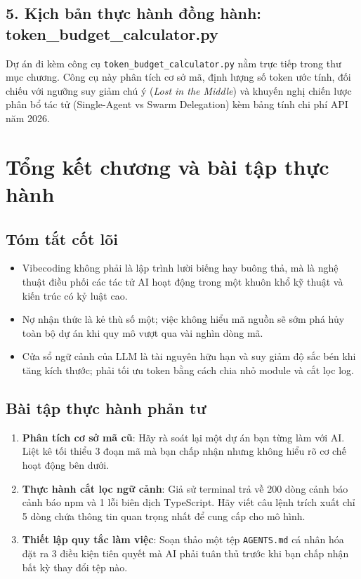 \documentclass[a4paper,11pt]{article}
\begin{document}
\subsection{5. Kịch bản thực hành đồng hành: token\_budget\_calculator.py}
Dự án đi kèm công cụ \texttt{token\_budget\_calculator.py} nằm trực tiếp trong thư mục chương. Công cụ này phân tích cơ sở mã, định lượng số token ước tính, đối chiếu với ngưỡng suy giảm chú ý (\textit{Lost in the Middle}) và khuyến nghị chiến lược phân bổ tác tử (Single-Agent vs Swarm Delegation) kèm bảng tính chi phí API năm 2026.

\section{Tổng kết chương và bài tập thực hành}

\subsection{Tóm tắt cốt lõi}
\begin{itemize}[leftmargin=1.5em]
    \item Vibecoding không phải là lập trình lười biếng hay buông thả, mà là nghệ thuật điều phối các tác tử AI hoạt động trong một khuôn khổ kỹ thuật và kiến trúc có kỷ luật cao.
    \item Nợ nhận thức là kẻ thù số một; việc không hiểu mã nguồn sẽ sớm phá hủy toàn bộ dự án khi quy mô vượt qua vài nghìn dòng mã.
    \item Cửa sổ ngữ cảnh của LLM là tài nguyên hữu hạn và suy giảm độ sắc bén khi tăng kích thước; phải tối ưu token bằng cách chia nhỏ module và cắt lọc log.
\end{itemize}

\subsection{Bài tập thực hành phản tư}
\begin{enumerate}[label={\arabic*.}]
    \item \textbf{Phân tích cơ sở mã cũ}: Hãy rà soát lại một dự án bạn từng làm với AI. Liệt kê tối thiểu 3 đoạn mã mà bạn chấp nhận nhưng không hiểu rõ cơ chế hoạt động bên dưới.
    \item \textbf{Thực hành cắt lọc ngữ cảnh}: Giả sử terminal trả về 200 dòng cảnh báo cảnh báo npm và 1 lỗi biên dịch TypeScript. Hãy viết câu lệnh trích xuất chỉ 5 dòng chứa thông tin quan trọng nhất để cung cấp cho mô hình.
    \item \textbf{Thiết lập quy tắc làm việc}: Soạn thảo một tệp \texttt{AGENTS.md} cá nhân hóa đặt ra 3 điều kiện tiên quyết mà AI phải tuân thủ trước khi bạn chấp nhận bất kỳ thay đổi tệp nào.
\end{enumerate}
\end{document}
